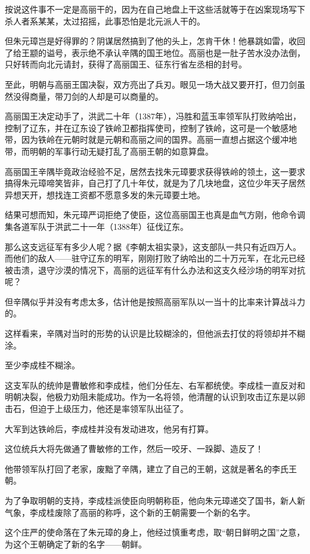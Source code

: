 \begin{multicols}{\theparacolNo}
		按说这件事不一定是高丽干的，因为在自己地盘上干这些活就等于在凶案现场写下杀人者系某某，太过招摇，此事恐怕是北元派人干的。

		但朱元璋岂是好得罪的？阴谋居然搞到了他的头上，怎肯干休！他暴跳如雷，收回了给王颛的谥号，表示绝不承认辛隅的国王地位。高丽也是一肚子苦水没办法倒，只好转而向北元请封，获得了高丽国王、征东行省左丞相的封号。

		至此，明朝与高丽王国决裂，双方亮出了兵刃。眼见一场大战又要开打，但刀剑虽然没得商量，带刀剑的人却是可以商量的。

		高丽国王决定动手了，洪武二十年（1387年），冯胜和蓝玉率领军队打败纳哈出，控制了辽东，并在辽东设了铁岭卫都指挥使司，控制了铁岭，这可是一个敏感地带，因为铁岭在元朝时就是元朝和高丽之间的国界。高丽一直想占据这个缓冲地带，而明朝的军事行动无疑打乱了高丽王朝的如意算盘。

		高丽国王辛隅毕竟政治经验不足，居然去找朱元璋要求获得铁岭的领土，这一要求搞得朱元璋啼笑皆非，自己打了几十年仗，就是为了几块地盘，这位少年天子居然异想天开，想找连工资都不愿意多发的朱元璋要土地。

		结果可想而知，朱元璋严词拒绝了使臣，这位高丽国王也真是血气方刚，他命令调集各道军队于洪武二十一年（1388年）征伐辽东。

		那么这支远征军有多少人呢？据《李朝太祖实录》，这支部队一共只有近四万人。而他们的敌人——驻守辽东的明军，刚刚打败了纳哈出的二十万元军，在北元已经被击溃，退守沙漠的情况下，高丽的远征军有什么办法和这支久经沙场的明军对抗呢？

		但辛隅似乎并没有考虑太多，估计他是按照高丽军队以一当十的比率来计算战斗力的。

		这样看来，辛隅对当时的形势的认识是比较糊涂的，但他派去打仗的将领却并不糊涂。

		至少李成桂不糊涂。

		这支军队的统帅是曹敏修和李成桂，他们分任左、右军都统使。李成桂一直反对和明朝决裂，他极力劝阻未能成功。作为一名将领，他清醒的认识到攻击辽东是以卵击石，但迫于上级压力，他还是率领军队出征了。

		大军到达铁岭后，李成桂并没有发动进攻，他另有打算。

		这位统兵大将先做通了曹敏修的工作，然后一咬牙、一跺脚、造反了！

		他带领军队打回了老家，废黜了辛隅，建立了自己的王朝，这就是著名的李氏王朝。

		为了争取明朝的支持，李成桂派使臣向明朝称臣，他向朱元璋递交了国书，新人新气象，李成桂废除了高丽的称呼，这个新的王朝需要一个新的名字。

		这个庄严的使命落在了朱元璋的身上，他经过慎重考虑，取“朝日鲜明之国”之意，为这个王朝确定了新的名字——朝鲜。


\end{multicols}
